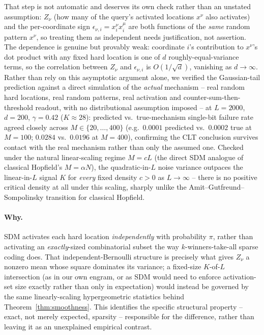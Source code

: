 \documentclass[11pt]{article}
\begin{document}
That step is not automatic and deserves its own check rather than an unstated assumption: $Z_\nu$
(how many of the query's activated locations $x^\nu$ also activates) and the per-coordinate sign
$\epsilon_{\nu,i}=x^\nu_i x^\mu_i$ are both functions of the \emph{same} random pattern $x^\nu$, so
treating them as independent needs justification, not assertion. The dependence is genuine but
provably weak: coordinate $i$'s contribution to $x^\nu$'s dot product with any fixed hard location
is one of $d$ roughly-equal-variance terms, so the correlation between $Z_\nu$ and
$\epsilon_{\nu,i}$ is $O(1/\sqrt d)$, vanishing as $d\to\infty$. Rather than rely on this asymptotic
argument alone, we verified the Gaussian-tail prediction against a direct simulation of the
\emph{actual} mechanism -- real random hard locations, real random patterns, real activation and
counter-sum-then-threshold readout, with no distributional assumption imposed -- at
$L{=}2000$, $d{=}200$, $\gamma{=}0.42$ ($K\approx28$): predicted vs.\ true-mechanism single-bit
failure rate agreed closely across $M\in\{20,\dots,400\}$ (e.g.\ $0.0001$ predicted vs.\ $0.0002$
true at $M{=}100$; $0.0284$ vs.\ $0.0196$ at $M{=}400$), confirming the CLT conclusion survives
contact with the real mechanism rather than only the assumed one. Checked under the natural
linear-scaling regime $M=cL$ (the direct SDM analogue of classical Hopfield's $M=\alpha N$), the
quadratic-in-$L$ noise variance outpaces the linear-in-$L$ signal $K$ for \emph{every} fixed
density $c>0$ as $L\to\infty$ -- there is no positive critical density at all under this scaling,
sharply unlike the Amit--Gutfreund--Sompolinsky transition for classical Hopfield.

\paragraph{Why.} SDM activates each hard location \emph{independently} with probability $\pi$,
rather than activating an \emph{exactly}-sized combinatorial subset the way $k$-winners-take-all
sparse coding does. That independent-Bernoulli structure is precisely what gives $Z_\nu$ a
nonzero mean whose square dominates its variance; a fixed-size $K$-of-$L$ intersection (as in our
own engram, or as SDM would need to enforce activation-set size exactly rather than only in
expectation) would instead be governed by the same linearly-scaling hypergeometric statistics
behind Theorem~\ref{thm:smoothness}. This identifies the specific structural property -- exact,
not merely expected, sparsity -- responsible for the difference, rather than leaving it as an
unexplained empirical contrast.
\end{document}
